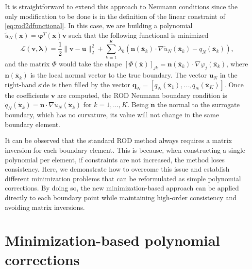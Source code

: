 \documentclass{article}
\renewcommand{\phi}{\varphi}
\begin{document}
It is straightforward to extend this approach to Neumann conditions since the only modification to be done is in the definition of the linear constraint of \eqref{eq:rod2dfunctional}. In this case, we are building a polynomial $\tilde u_N(\boldsymbol{x})=\boldsymbol{\phi}^T(\boldsymbol{x})\boldsymbol{v}$ such that the following functional is minimized
%
\begin{equation}\label{eq:rod2dfunctionalNeumann}
\mathcal{L}(\boldsymbol{v}, \boldsymbol{\lambda}) = \frac12 \|\boldsymbol{v}-\boldsymbol{u}\|^2_2 + \sum_{k=1}^K \lambda_k \left( \boldsymbol{n}(\bar{\boldsymbol{x}}_k) \cdot \nabla \tilde u_N(\bar{\boldsymbol{x}}_k) - q_N(\bar{\boldsymbol{x}}_k) \right),
\end{equation}
%
and the matrix $\Phi$ would take the shape $ [\Phi(\bar{\boldsymbol{x}})]_{j k} = \boldsymbol{n}(\bar{\boldsymbol{x}}_k) \cdot \nabla \phi_j(\bar{\boldsymbol{x}}_k)$, where $\boldsymbol{n}(\bar{\boldsymbol{x}}_k)$ is the local normal vector to the true boundary.
The vector $\boldsymbol{u}_N$ in the right-hand side is then filled by the vector $\boldsymbol{q}_N=[q_N(\bar{\boldsymbol{x}}_1),\ldots,q_N(\bar{\boldsymbol{x}}_K)]$.
Once the coefficients $\boldsymbol{v}$ are computed, the ROD Neumann boundary condition is $\tilde q_N(\tilde{\boldsymbol{x}}_k)=\tilde{\boldsymbol{n}}\cdot\nabla \tilde u_N(\tilde{\boldsymbol{x}}_k)$ for $k=1,\ldots,K$. Being $\tilde{\boldsymbol{n}}$ the normal to the surrogate boundary, which has no curvature, its value will not change in the same boundary element. 

It can be observed that the standard ROD method always requires a matrix inversion for each boundary element. This is because, when constructing a single polynomial per element, if constraints are not increased, the method loses consistency. Here, we demonstrate how to overcome this issue and establish different minimization problems that can be reformulated as simple polynomial corrections. By doing so, the new minimization-based approach can be applied directly to each boundary point while maintaining high-order consistency and avoiding matrix inversions.










\section{Minimization-based polynomial corrections}\label{sec:PolyCorrDir}
\end{document}
